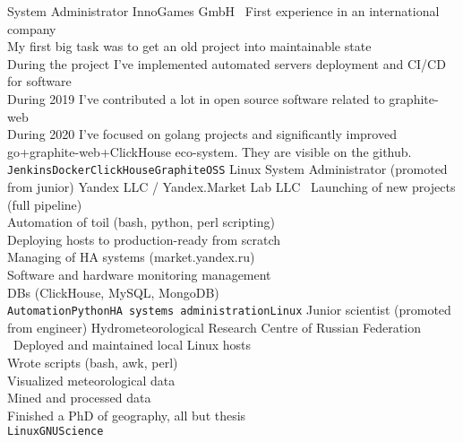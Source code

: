 \documentclass[11pt]{developercv} %
\begin{document}
\begin{entrylist}
    {System Administrator}
    {InnoGames GmbH}
    {\
      First experience in an international company\\
      My first big task was to get an old project into maintainable state\\
      During the project I've implemented automated servers deployment and CI/CD for software\\
      During 2019 I've contributed a lot in open source software related to graphite-web\\
      During 2020 I've focused on golang projects and significantly improved go+graphite-web+ClickHouse eco-system. They are visible on the github.\\
      \texttt{Jenkins}\slashsep\texttt{Docker}\slashsep\texttt{ClickHouse}\slashsep\texttt{Graphite}\slashsep\texttt{OSS}
    }
    {Linux System Administrator (promoted from junior)}
    {Yandex LLC / Yandex.Market Lab LLC}
    {\
      Launching of new projects (full pipeline)\\
      Automation of toil (bash, python, perl scripting)\\
      Deploying hosts to production-ready from scratch\\
      Managing of HA systems (market.yandex.ru)\\
      Software and hardware monitoring management\\
      DBs (ClickHouse, MySQL, MongoDB)\\
      \texttt{Automation}\slashsep\texttt{Python}\slashsep\texttt{HA systems administration}\slashsep\texttt{Linux}
    }
  \entry{2009 --- 2013}
    {Junior scientist (promoted from engineer)}
    {Hydrometeorological Research Centre of Russian Federation}
    {\
      Deployed and maintained local Linux hosts\\
      Wrote scripts (bash, awk, perl)\\
      Visualized meteorological data\\
      Mined and processed data\\
      Finished a PhD of geography, all but thesis\\
      \texttt{Linux}\slashsep\texttt{GNU}\slashsep\texttt{Science}
    }
\end{entrylist}

\end{document}
